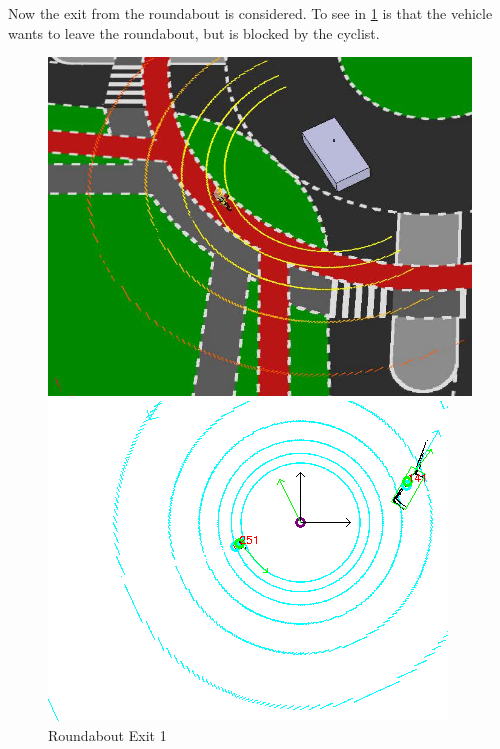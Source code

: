 \documentclass[11pt,oneside,openright]{mpreport}
\begin{document}
Now the exit from the roundabout is considered. To see in \cref{roundabout_exit_1} is that the vehicle wants to leave the roundabout, but is blocked by the cyclist.

\begin{figure}[htb]
  \caption{Roundabout Exit 1} 
    \centering
    \begin{minipage}[t]{0.49\textwidth}
        \centering
          \includegraphics[width=\textwidth]{bilder/sim07.png}
    \end{minipage}%
    \hfill
    \begin{minipage}[t]{0.49\textwidth}
        \centering
	\includegraphics[width=\textwidth]{bilder/sim08.png}
    \end{minipage}
    \label{roundabout_exit_1}
\end{figure}
\end{document}
